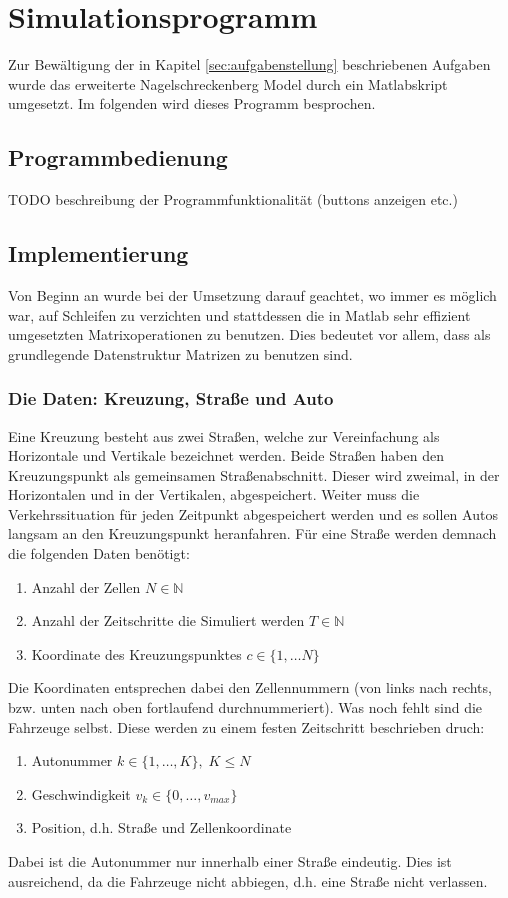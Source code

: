 \chapter{Simulationsprogramm}
Zur Bewältigung der in Kapitel \ref{sec:aufgabenstellung} beschriebenen
Aufgaben wurde das erweiterte Nagelschreckenberg Model 
durch ein Matlabskript umgesetzt. Im folgenden wird dieses
Programm besprochen.

\section{Programmbedienung}
TODO beschreibung der Programmfunktionalität (buttons anzeigen etc.)

\section{Implementierung}
Von Beginn an wurde bei der Umsetzung darauf geachtet, wo immer es möglich 
war, auf Schleifen zu verzichten und stattdessen die in Matlab sehr effizient 
umgesetzten Matrixoperationen zu benutzen. Dies bedeutet vor allem, dass als 
grundlegende Datenstruktur Matrizen zu benutzen sind. 

\subsection{Die Daten: Kreuzung, Straße und Auto}
Eine Kreuzung besteht aus zwei Straßen, welche zur Vereinfachung als Horizontale und Vertikale
bezeichnet werden. Beide Straßen haben den Kreuzungspunkt als gemeinsamen Straßenabschnitt. Dieser
wird zweimal, in der Horizontalen und in der Vertikalen, abgespeichert. 
Weiter muss die Verkehrssituation für jeden Zeitpunkt abgespeichert werden und
es sollen Autos langsam an den Kreuzungspunkt heranfahren. 
Für eine Straße werden demnach die folgenden Daten benötigt:
\begin{enumerate}
  \item Anzahl der Zellen \(N \in \mathbb{N}\)
  \item Anzahl der Zeitschritte die Simuliert werden \(T \in \mathbb{N}\)
  \item Koordinate des Kreuzungspunktes \(c \in \{ 1, \ldots N \}\)
\end{enumerate}
Die Koordinaten entsprechen dabei den Zellennummern (von links nach rechts, bzw. unten nach oben fortlaufend durchnummeriert). 
Was noch fehlt sind die Fahrzeuge selbst. Diese werden zu einem festen Zeitschritt beschrieben druch:
\begin{enumerate}
  \item Autonummer \(k \in \{ 1, \ldots, K \}, \; K \leq N\) 
  \item Geschwindigkeit \(v_k \in \{0, \ldots, v_{max} \}\)
  \item Position, d.h. Straße und Zellenkoordinate
\end{enumerate}
Dabei ist die Autonummer nur innerhalb einer Straße eindeutig. Dies ist ausreichend, da die Fahrzeuge nicht 
abbiegen, d.h. eine Straße nicht verlassen.

